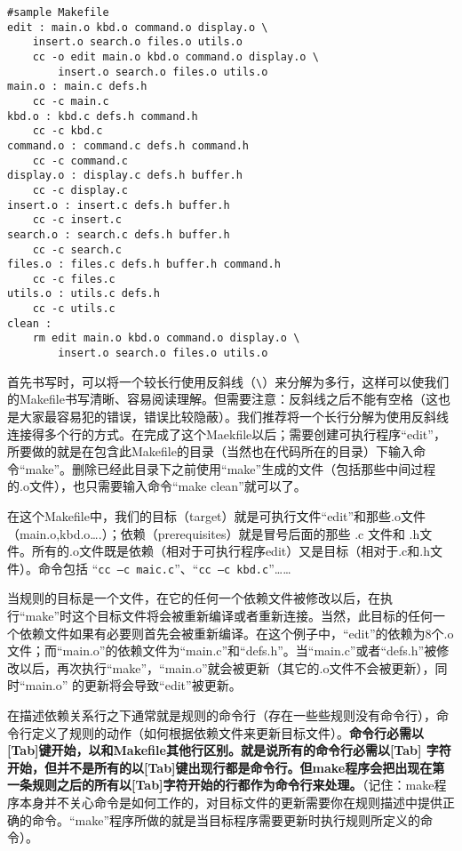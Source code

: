 \begin{Verbatim}[]
#sample Makefile
edit : main.o kbd.o command.o display.o \
    insert.o search.o files.o utils.o
    cc -o edit main.o kbd.o command.o display.o \
        insert.o search.o files.o utils.o
main.o : main.c defs.h
    cc -c main.c
kbd.o : kbd.c defs.h command.h
    cc -c kbd.c
command.o : command.c defs.h command.h
    cc -c command.c
display.o : display.c defs.h buffer.h
    cc -c display.c
insert.o : insert.c defs.h buffer.h
    cc -c insert.c
search.o : search.c defs.h buffer.h
    cc -c search.c
files.o : files.c defs.h buffer.h command.h
    cc -c files.c
utils.o : utils.c defs.h
    cc -c utils.c
clean :
    rm edit main.o kbd.o command.o display.o \
        insert.o search.o files.o utils.o
\end{Verbatim}

首先书写时，可以将一个较长行使用反斜线（\verb"\"）来分解为多行，这样可以使我们的Makefile书写清晰、容易阅读理解。但需要注意：反斜线之后不能有空格（这也是大家最容易犯的错误，错误比较隐蔽）。我们推荐将一个长行分解为使用反斜线连接得多个行的方式。在完成了这个Maekfile以后；需要创建可执行程序“edit”，所要做的就是在包含此Makefile的目录（当然也在代码所在的目录）下输入命令“make”。删除已经此目录下之前使用“make”生成的文件（包括那些中间过程的.o文件），也只需要输入命令“make clean”就可以了。

在这个Makefile中，我们的目标（target）就是可执行文件“edit”和那些.o文件（main.o,kbd.o….）；依赖（prerequisites）就是冒号后面的那些 .c 文件和 .h文件。所有的.o文件既是依赖（相对于可执行程序edit）又是目标（相对于.c和.h文件）。命令包括 “\verb"cc –c maic.c"”、“\verb"cc –c kbd.c"”……

当规则的目标是一个文件，在它的任何一个依赖文件被修改以后，在执行“make”时这个目标文件将会被重新编译或者重新连接。当然，此目标的任何一个依赖文件如果有必要则首先会被重新编译。在这个例子中，“edit”的依赖为8个.o文件；而“main.o”的依赖文件为“main.c”和“defs.h”。当“main.c”或者“defs.h”被修改以后，再次执行“make”，“main.o”就会被更新（其它的.o文件不会被更新），同时“main.o” 的更新将会导致“edit”被更新。

在描述依赖关系行之下通常就是规则的命令行（存在一些些规则没有命令行），命令行定义了规则的动作（如何根据依赖文件来更新目标文件）。\textbf{命令行必需以[Tab]键开始，以和Makefile其他行区别。就是说所有的命令行必需以[Tab] 字符开始，但并不是所有的以[Tab]键出现行都是命令行。但make程序会把出现在第一条规则之后的所有以[Tab]字符开始的行都作为命令行来处理。}（记住：make程序本身并不关心命令是如何工作的，对目标文件的更新需要你在规则描述中提供正确的命令。“make”程序所做的就是当目标程序需要更新时执行规则所定义的命令）。

